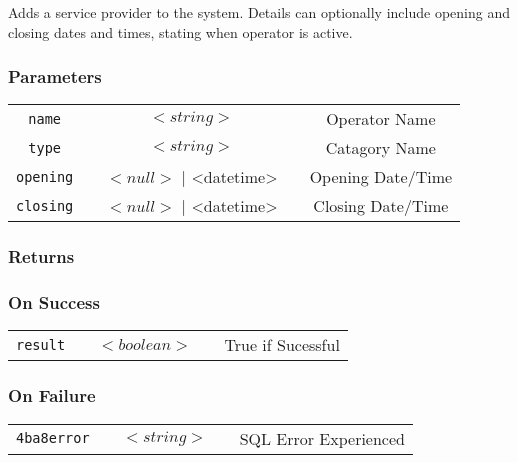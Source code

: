 \documentclass[a4paper,12pt]{article}
\begin{document}
Adds a service provider to the system. Details can optionally include
opening and closing dates and times, stating when operator is active.  

\subsubsection{Parameters}

\begin{tabular}{ccccc}
\verb!name! & \vspace{15mm} & $<string>$ & \vspace{15mm} & Operator Name \\
\verb!type! & \vspace{15mm} & $<string>$ & \vspace{15mm} & Catagory Name \\
\verb!opening! & \vspace{15mm} & $<null>$ | <datetime> & \vspace{15mm} & Opening Date/Time \\
\verb!closing! & \vspace{15mm} & $<null>$ | <datetime> & \vspace{15mm} & Closing Date/Time \\
\end{tabular}

\subsubsection{Returns}

\subsubsection{On Success}

\begin{tabular}{ccccc}
\verb!result! & \vspace{15mm} & $<boolean>$ & \vspace{15mm} & True if Sucessful \\
\end{tabular}

\subsubsection{On Failure}

\begin{tabular}{ccccc}
\verb!4ba8error! & \vspace{15mm} & $<string>$ & \vspace{15mm} & SQL Error Experienced \\
\end{tabular}
\end{document}

